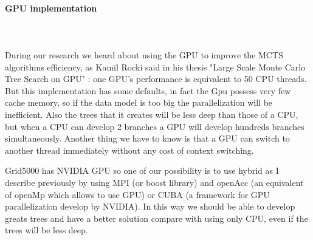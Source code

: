 \paragraph{GPU implementation}\mbox{}\\\mbox{}\\

During our research we heard about using the GPU to improve the MCTS algorithms efficiency, as Kamil Rocki said in his thesis "Large Scale Monte Carlo Tree Search on GPU"  \cite{GPU} : one GPU's performance is equivalent to 50 CPU threads. But this implementation has some defaults, in fact the Gpu possess very few cache memory, so if the data model is too big the parallelization will be inefficient. Also the trees that it creates will be less deep than those of a CPU, but when a CPU can develop 2 branches a GPU will develop hundreds branches simultaneously. Another thing we have to know is that a GPU can switch to another thread immediately without any cost of context switching. 

Grid5000 has NVIDIA GPU so one of our possibility is to use hybrid as I describe previously by using MPI (or boost library) and openAcc (an equivalent of openMp which allows to use GPU) or CUBA (a framework for GPU parallelization develop by NVIDIA). In this way we should be able to develop greats trees and have a better solution compare with using only CPU, even if the trees will be less deep.